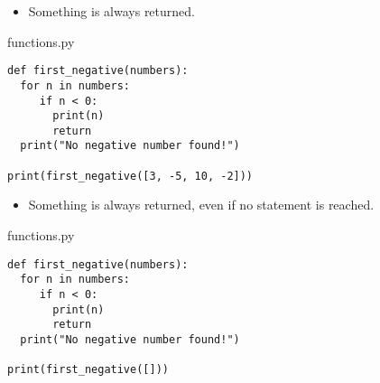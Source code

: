 \documentclass[aspectratio=1610,slidestop]{beamer}
\begin{document}
\begin{pframe}
 \begin{itemize}
  \item Something is always returned.
 \end{itemize}
 \medskip

 \begin{minipage}[t]{0.52\textwidth}
  \begin{pythonfile}{functions.py}
   \begin{verbatim}
def first_negative(numbers):
  for n in numbers:
     if n < 0:
       print(n)
       return
  print("No negative number found!")

print(first_negative([3, -5, 10, -2]))
   \end{verbatim}
  \end{pythonfile}
 \end{minipage}\qquad
 \pause
 \begin{minipage}[t]{0.42\textwidth}
 \vspace{-4.15cm}
 \begin{terminal}
 \end{terminal}
 \end{minipage}
\end{pframe}


\begin{pframe}
 \begin{itemize}
  \item Something is always returned, even if no  statement is reached.
 \end{itemize}
 \medskip

 \begin{minipage}[t]{0.52\textwidth}
  \begin{pythonfile}{functions.py}
   \begin{verbatim}
def first_negative(numbers):
  for n in numbers:
     if n < 0:
       print(n)
       return
  print("No negative number found!")

print(first_negative([]))
   \end{verbatim}
  \end{pythonfile}
 \end{minipage}\qquad
 \pause
 \begin{minipage}[t]{0.42\textwidth}
 \vspace{-4.15cm}
 \begin{terminal}
 \end{terminal}
 \end{minipage}
\end{pframe}
\end{document}
